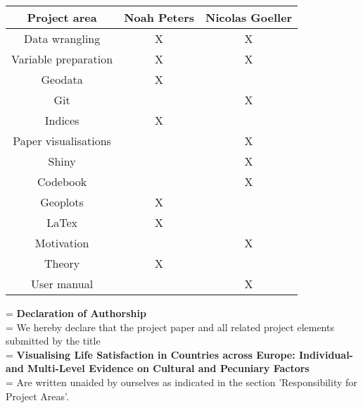\documentclass[preprint,12pt,authoryear]{elsarticle}
\begin{document}
\begin{tabular}{|c|c|c|}
	\hline 
	\textbf{Project area}	& \textbf{Noah Peters} 	& \textbf{Nicolas Goeller} 	\\ 
	\hline 
	Data wrangling			&  		   X			&  				X 			\\ 
	\hline 
	Variable preparation 	&  		   X			&  				X 			\\ 
	\hline 
	Geodata					&  		   X			&  				 			\\ 
	\hline 
	Git	     			 	&  		   				&  				X 			\\ 
	\hline 			
	Indices				 	&  		   X			&  				 			\\ 
	\hline 
	Paper visualisations 	&  		   				&  				X 			\\ 
	\hline 
	Shiny 				 	&  		   				&  				X 			\\ 
	\hline 
	Codebook 			 	&  		   				&  				X 			\\ 
	\hline 
	Geoplots 			 	&  		   X			&  				 			\\ 
	\hline 
	LaTex				 	&  		   X			&  				 			\\ 
	\hline 
	Motivation			 	&  		   				&  				X 			\\ 
	\hline 
	Theory				 	&  		   X			&  				 			\\ 
	\hline 
	User manual			 	&  		   				&  				X 			\\ 
	\hline 
\end{tabular}

	\newpage
	 
	
	
	\newpage
	\hangindent=\parindent
	\parindent 0pt
	\textbf{Declaration of Authorship}
	\\
	
	\hangindent=\parindent
	\parindent 0pt
	We hereby declare that the project paper and all related project elements submitted by the title 
	\\
	
	\hangindent=\parindent
	\parindent 0pt
	\textbf{Visualising Life Satisfaction in Countries across Europe: Individual- and Multi-Level Evidence on Cultural and Pecuniary Factors} 
	\\
	
	\hangindent=\parindent
	\parindent 0pt
	Are written unaided by ourselves as indicated in the section 'Responsibility for Project Areas'. 
	\\
	
\end{document}
